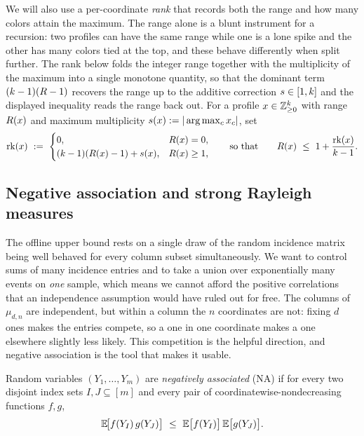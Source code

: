 We will also use a per-coordinate \emph{rank} that records both the range and how many colors attain the maximum. The range
alone is a blunt instrument for a recursion: two profiles can have the same range while one is a lone spike and the other
has many colors tied at the top, and these behave differently when split further. The rank below folds the integer range
together with the multiplicity of the maximum into a single monotone quantity, so that the dominant term $(k-1)(R-1)$
recovers the range up to the additive correction $s\in[1,k]$ and the displayed inequality reads the range back out.
For a profile $x\in\mathbb{Z}_{\ge0}^k$ with range $R(x)$ and maximum multiplicity $s(x):=|\arg\max_c x_c|$, set
\begin{equation}\label{eq:rank}
  \mathrm{rk}(x)\ :=\
  \begin{cases}
    0, & R(x)=0,\\
    (k-1)(R(x)-1)+s(x), & R(x)\ge 1,
  \end{cases}
  \qquad\text{so that}\qquad
  R(x)\ \le\ 1+\frac{\mathrm{rk}(x)}{k-1}.
\end{equation}

\subsection{Negative association and strong Rayleigh measures}\label{sec:NA}

The offline upper bound rests on a single draw of the random incidence matrix being well behaved for every column
subset simultaneously. We want to control sums of many incidence entries and to take a union over exponentially many
events on \emph{one} sample, which means we cannot afford the positive correlations that an independence assumption would
have ruled out for free. The columns of $\mu_{d,n}$ are independent, but within a column the $n$ coordinates are not: fixing
$d$ ones makes the entries compete, so a one in one coordinate makes a one elsewhere slightly less likely. This competition
is the helpful direction, and negative association is the tool that makes it usable.

\begin{definition}\label{def:NA}
Random variables $(Y_1,\dots,Y_m)$ are \emph{negatively associated} (NA) if for every two disjoint index sets
$I,J\subseteq[m]$ and every pair of coordinatewise-nondecreasing functions $f,g$,
\[
  \E\!\big[f(Y_I)\,g(Y_J)\big]\ \le\ \E\big[f(Y_I)\big]\,\E\big[g(Y_J)\big].
\]
\end{definition}


